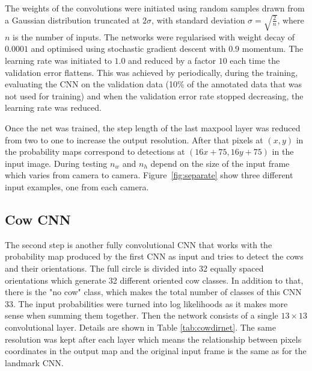 \documentclass{cta-author}
\begin{document}
The weights of the convolutions were initiated using random samples drawn from a Gaussian
distribution truncated at $2\sigma$, with standard deviation $\sigma=\sqrt{\frac{2}{n}}$,
where $n$ is the number of inputs\cite{DBLP:journals/corr/HeZR015}. The networks were regularised with weight
decay of
$0.0001$ and optimised using stochastic gradient descent with $0.9$ momentum. The
learning rate was initiated to $1.0$ and reduced by a factor $10$ each time the validation
error flattens. This was achieved by periodically, during the training, evaluating the CNN on the validation data
(10\% of the annotated data that was not used for training) and when the validation error rate stopped decreasing,
the learning rate was reduced.

Once the net was trained, the step length of the last maxpool layer was reduced from two to one to increase
the output resolution. After that pixels at $\left(x, y\right)$ in the probability maps correspond to
detections at $\left(16 x + 75, 16 y + 75\right)$ in the input image. During testing $n_w$ and $n_h$ depend on the size of the input frame which varies from camera to camera. Figure~\ref{fig:separate} show three different input examples, one from each camera.

\subsection{Cow CNN}

The second step is another fully convolutional CNN that works with the probability map produced by the first CNN
as input and tries to detect the cows and their orientations. The full circle is divided into 32 equally
spaced orientations which generate 32 different oriented cow classes. In addition to that, there is the "no
cow" class, which makes the total number of classes of this CNN 33. The input probabilities were turned into
log likelihoods as it makes more sense when summing them together. Then the network consists of a single $ 13
\times 13 $ convolutional layer. Details are shown in Table \ref{tab:cowdirnet}. The same resolution was kept
after each layer which means the relationship between pixels coordinates in the output map and the original
input frame is the same as for the landmark CNN.
\end{document}
